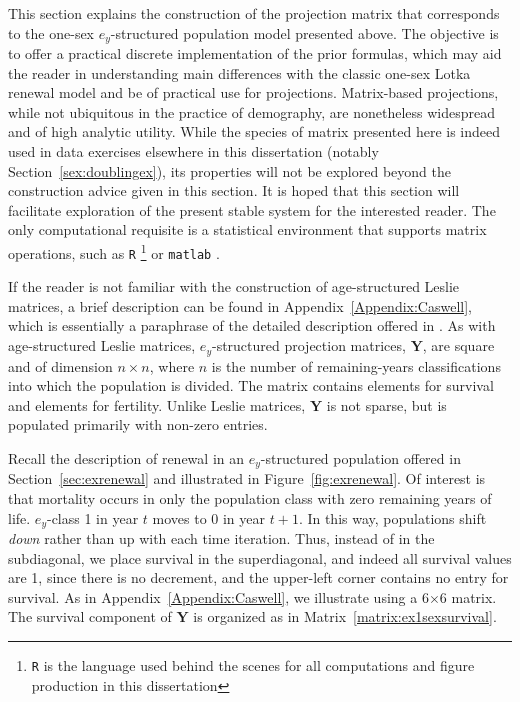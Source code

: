  \FloatBarrier
\label{sec:ex1sexleslie}
This section explains the construction of the projection matrix that corresponds
to the one-sex $e_y$-structured population model presented above. The objective is
to offer a practical discrete implementation of the prior
formulas, which may aid the reader in understanding main differences with the
classic one-sex Lotka renewal model and be of practical use for projections.
Matrix-based projections, while not ubiquitous in the practice of demography,
are nonetheless widespread and of high analytic utility. While the species of
matrix presented here is indeed used in data exercises elsewhere in this
dissertation (notably Section~\ref{sex:doublingex}), its properties will not be
explored beyond the construction advice given in this section. It is hoped that
this section will facilitate exploration of the present stable system for
the interested reader. The only computational requisite is a statistical
environment that supports matrix operations, such as
\texttt{R} \citep{Rcitation}\footnote{\texttt{R} is the language used behind the
scenes for all computations and figure production in this dissertation} or
\texttt{matlab} \citep{MATLAB:2010}.

If the reader is not familiar with the construction
of age-structured Leslie matrices, a brief description can be found in
Appendix~\ref{Appendix:Caswell}, which is essentially a paraphrase of the
detailed description offered in \cite{caswell2001matrix}. As with
age-structured Leslie matrices, $e_y$-structured projection matrices,
$\textbf{Y}$, are square and of dimension $n \times n$, where $n$ is the number
of remaining-years classifications into which the population is divided. The matrix contains
elements for survival and elements for fertility. Unlike Leslie matrices,
$\textbf{Y}$ is not sparse, but is populated primarily with non-zero entries.

Recall the description of renewal in an $e_y$-structured population offered in
Section~\ref{sec:exrenewal} and illustrated in Figure~\ref{fig:exrenewal}. Of
interest is that mortality occurs in only the population class with zero
remaining years of life. $e_y$-class 1 in year $t$ moves to 0 in year $t+1$.
In this way, populations shift \textit{down} rather than up with each time iteration.
Thus, instead of in the subdiagonal, we place survival in the superdiagonal, and
indeed all survival values are 1, since there is no decrement, and the
upper-left corner contains no entry for survival. As in
Appendix~\ref{Appendix:Caswell}, we illustrate using a 6$\times$6 matrix. The
survival component of $\textbf{Y}$ is organized as in
Matrix~\ref{matrix:ex1sexsurvival}.

